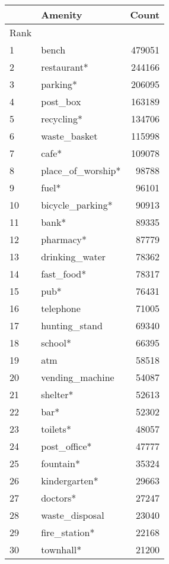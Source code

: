 \begin{tabular}{llr}
\toprule
{} &            Amenity &   Count \\
\midrule
Rank &                    &         \\
1    &              bench &  479051 \\
2    &        restaurant* &  244166 \\
3    &           parking* &  206095 \\
4    &           post\_box &  163189 \\
5    &         recycling* &  134706 \\
6    &       waste\_basket &  115998 \\
7    &              cafe* &  109078 \\
8    &  place\_of\_worship* &   98788 \\
9    &              fuel* &   96101 \\
10   &   bicycle\_parking* &   90913 \\
11   &              bank* &   89335 \\
12   &          pharmacy* &   87779 \\
13   &     drinking\_water &   78362 \\
14   &         fast\_food* &   78317 \\
15   &               pub* &   76431 \\
16   &          telephone &   71005 \\
17   &      hunting\_stand &   69340 \\
18   &            school* &   66395 \\
19   &                atm &   58518 \\
20   &    vending\_machine &   54087 \\
21   &           shelter* &   52613 \\
22   &               bar* &   52302 \\
23   &           toilets* &   48057 \\
24   &       post\_office* &   47777 \\
25   &          fountain* &   35324 \\
26   &      kindergarten* &   29663 \\
27   &           doctors* &   27247 \\
28   &     waste\_disposal &   23040 \\
29   &      fire\_station* &   22168 \\
30   &          townhall* &   21200 \\

\end{tabular}
